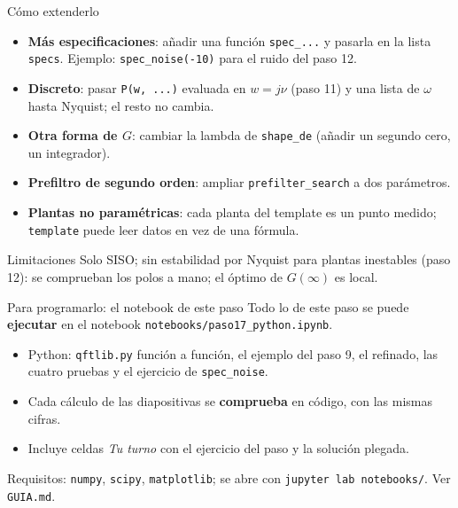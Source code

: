 \documentclass[aspectratio=169,11pt]{beamer}
\begin{document}
\begin{frame}{Cómo extenderlo}
  \small
  \begin{itemize}
    \item \textbf{Más especificaciones}: añadir una función \texttt{spec\_...} y pasarla en la lista \texttt{specs}. Ejemplo: \texttt{spec\_noise(-10)} para el ruido del paso 12.
    \item \textbf{Discreto}: pasar \texttt{P(w, ...)} evaluada en $w=j\nu$ (paso 11) y una lista de $\omega$ hasta Nyquist; el resto no cambia.
    \item \textbf{Otra forma de $G$}: cambiar la lambda de \texttt{shape\_de} (añadir un segundo cero, un integrador).
    \item \textbf{Prefiltro de segundo orden}: ampliar \texttt{prefilter\_search} a dos parámetros.
    \item \textbf{Plantas no paramétricas}: cada planta del template es un punto medido; \texttt{template} puede leer datos en vez de una fórmula.
  \end{itemize}
  \begin{block}{Limitaciones}
    Solo SISO; sin estabilidad por Nyquist para plantas inestables (paso 12): se comprueban los polos a mano; el óptimo de $G(\infty)$ es local.
  \end{block}
\end{frame}

\begin{frame}{Para programarlo: el notebook de este paso}
  \small
  Todo lo de este paso se puede \textbf{ejecutar} en el notebook \texttt{notebooks/paso17\_python.ipynb}.
  \begin{itemize}
    \item Python: \texttt{qftlib.py} función a función, el ejemplo del paso 9, el refinado, las cuatro pruebas y el ejercicio de \texttt{spec\_noise}.
    \item Cada cálculo de las diapositivas se \textbf{comprueba} en código, con las mismas cifras.
    \item Incluye celdas \emph{Tu turno} con el ejercicio del paso y la solución plegada.
  \end{itemize}
  \footnotesize Requisitos: \texttt{numpy}, \texttt{scipy}, \texttt{matplotlib}; se abre con \texttt{jupyter lab notebooks/}. Ver \texttt{GUIA.md}.
\end{frame}
\end{document}
